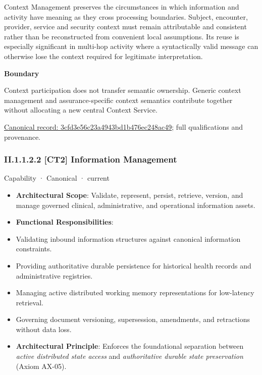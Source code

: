 Context Management preserves the circumstances in which information and activity have meaning as they cross processing boundaries. Subject, encounter, provider, service and security context must remain attributable and consistent rather than be reconstructed from convenient local assumptions. Its reuse is especially significant in multi-hop activity where a syntactically valid message can otherwise lose the context required for legitimate interpretation.



\textbf{Boundary}



Context participation does not transfer semantic ownership. Generic context management and assurance-specific context semantics contribute together without allocating a new central Context Service.


{\footnotesize \href{../../../../../../../continuum/strategy/capability/3cfd3e56c23a4943bd1b476ec248ac49.md}{Canonical record: 3cfd3e56c23a4943bd1b476ec248ac49}; full qualifications and provenance.}\par
\subsubsection*{II.1.1.2.2 [CT2] Information Management}
\label{navigation:II.1.1.2.2}

\label{element:43051efd406b4040bff8e794b7a631e0}
{\small Capability · Canonical · current}\par

\begin{itemize}


\item \textbf{Architectural Scope}: Validate, represent, persist, retrieve, version, and manage governed clinical, administrative, and operational information assets.

\item \textbf{Functional Responsibilities}:

\item Validating inbound information structures against canonical information constraints.

\item Providing authoritative durable persistence for historical health records and administrative registries.

\item Managing active distributed working memory representations for low-latency retrieval.

\item Governing document versioning, supersession, amendments, and retractions without data loss.

\item \textbf{Architectural Principle}: Enforces the foundational separation between \emph{active distributed state access} and \emph{authoritative durable state preservation} (Axiom AX-05).

\end{itemize}


